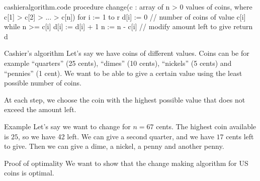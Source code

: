 \documentclass[a4paper]{article}
\begin{document}
\begin{filecontents*}[overwrite]{cashieralgorithm.code}
procedure change(c : array of n > 0 values of coins, where c[1] > c[2] > ... > c[n])
    for i := 1 to r
        d[i] := 0  // number of coins of value c[i]
        while n >= c[i]
            d[i] := d[i] + 1
            n := n - c[i]  // modify amount left to give
    return d
\end{filecontents*}

\begin{parag}{Cashier's algorithm}
    Let's say we have coins of different values. Coins can be for example ``quarters'' (25 cents), ``dimes'' (10 cents), ``nickels'' (5 cents) and ``pennies'' (1 cent). We want to be able to give a certain value using the least possible number of coins.

    At each step, we choose the coin with the highest possible value that does not exceed the amount left.

\end{parag}

\begin{parag}{Example}
    Let's say we want to change for $n = 67$ cents. The highest coin available is $25$, so we have 42 left. We can give a second quarter, and we have $17$ cents left to give. Then we can give a dime, a nickel, a penny and another penny.
\end{parag}

\begin{parag}{Proof of optimality}
    We want to show that the change making algorithm for US coins is optimal.

\end{parag}
\end{document}
